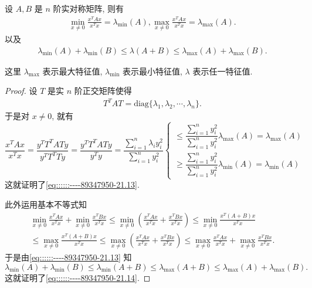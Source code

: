 \documentclass[../../main.tex]{subfiles}
\begin{document}
\begin{proposition}\label{proposition:Rayleigh-quotient瑞丽商的基本性质}
设 \( A, B \) 是 \( n \) 阶实对称矩阵, 则有
\begin{align}
\min_{x \neq 0} \frac{x^T A x}{x^T x} = \lambda_{\min}(A), \max_{x \neq 0} \frac{x^T A x}{x^T x} = \lambda_{\max}(A). \label{eq::::::----89347950-21.13}
\end{align}
以及
\begin{align}
\lambda_{\min}(A) + \lambda_{\min}(B) \leqslant \lambda(A + B) \leqslant \lambda_{\max}(A) + \lambda_{\max}(B). \label{eq::::::----89347950-21.14}
\end{align}
\end{proposition}
\begin{note}
这里 \( \lambda_{\max} \) 表示最大特征值, \( \lambda_{\min} \) 表示最小特征值, \( \lambda \) 表示任一特征值.
\end{note}
\begin{proof}
设 \( T \) 是实 \( n \) 阶正交矩阵使得
\begin{align*}
T^T A T = \text{diag} \{ \lambda_1, \lambda_2, \cdots, \lambda_n \} .
\end{align*}
于是对 \( x \neq 0 \), 就有
\[
\frac{x^T A x}{x^T x} = \frac{y^T T^T A T y}{y^T T^T T y} = \frac{y^T T^T A T y}{y^T y} = \frac{\sum\limits_{i=1}^n \lambda_i y_i^2}{\sum\limits_{i=1}^n y_i^2}
\begin{cases} 
\leqslant \dfrac{\sum\limits_{i=1}^n y_i^2}{\sum\limits_{i=1}^n y_i^2} \lambda_{\max}(A)=\lambda_{\max}(A)  \\
\geqslant \dfrac{\sum\limits_{i=1}^n y_i^2}{\sum\limits_{i=1}^n y_i^2} \lambda_{\min}(A)=\lambda_{\min}(A)
\end{cases}
\]
这就证明了\eqref{eq::::::----89347950-21.13}.

此外运用基本不等式知
\begin{gather*}
\min_{x\ne 0} \frac{x^TAx}{x^Tx}+\min_{x\ne 0} \frac{x^TBx}{x^Tx}\leqslant \min_{x\ne 0} \left( \frac{x^TAx}{x^Tx}+\frac{x^TBx}{x^Tx} \right) \leqslant \min_{x\ne 0} \frac{x^T(A+B)x}{x^Tx}
\\
\leqslant \max_{x\ne 0} \frac{x^T(A+B)x}{x^Tx}\leqslant \max_{x\ne 0} \left( \frac{x^TAx}{x^Tx}+\frac{x^TBx}{x^Tx} \right) \leqslant \max_{x\ne 0} \frac{x^TAx}{x^Tx}+\max_{x\ne 0} \frac{x^TBx}{x^Tx}.
\end{gather*}
于是由\eqref{eq::::::----89347950-21.13} 知
\[
\lambda_{\min}(A) + \lambda_{\min}(B) \leqslant \lambda_{\min}(A + B) \leqslant \lambda_{\max}(A + B) \leqslant \lambda_{\max}(A) + \lambda_{\max}(B).
\]
这就证明了\eqref{eq::::::----89347950-21.14}.

\end{proof}
\end{document}
